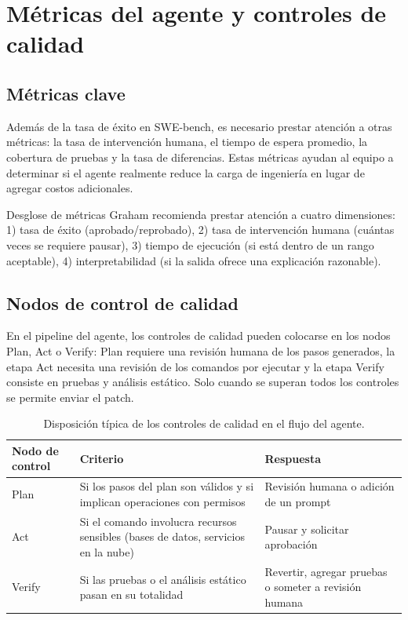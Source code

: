 \section{Métricas del agente y controles de calidad}
\subsection{Métricas clave}
Además de la tasa de éxito en SWE-bench, es necesario prestar atención a otras métricas: la tasa de intervención humana, el tiempo de espera promedio, la cobertura de pruebas y la tasa de diferencias. Estas métricas ayudan al equipo a determinar si el agente realmente reduce la carga de ingeniería en lugar de agregar costos adicionales.

\begin{importantbox}{Desglose de métricas}
Graham recomienda prestar atención a cuatro dimensiones: 1) tasa de éxito (aprobado/reprobado), 2) tasa de intervención humana (cuántas veces se requiere pausar), 3) tiempo de ejecución (si está dentro de un rango aceptable), 4) interpretabilidad (si la salida ofrece una explicación razonable).
\end{importantbox}

\subsection{Nodos de control de calidad}
En el pipeline del agente, los controles de calidad pueden colocarse en los nodos Plan, Act o Verify: Plan requiere una revisión humana de los pasos generados, la etapa Act necesita una revisión de los comandos por ejecutar y la etapa Verify consiste en pruebas y análisis estático. Solo cuando se superan todos los controles se permite enviar el patch.

\begin{table}[H]
\centering
\begin{tabular}{p{} p{} p{}}
\toprule
Nodo de control & Criterio & Respuesta \\
\midrule
Plan & Si los pasos del plan son válidos y si implican operaciones con permisos & Revisión humana o adición de un prompt \\
\midrule
Act & Si el comando involucra recursos sensibles (bases de datos, servicios en la nube) & Pausar y solicitar aprobación \\
\midrule
Verify & Si las pruebas o el análisis estático pasan en su totalidad & Revertir, agregar pruebas o someter a revisión humana \\
\bottomrule
\end{tabular}
\caption{Disposición típica de los controles de calidad en el flujo del agente.}
\end{table}

